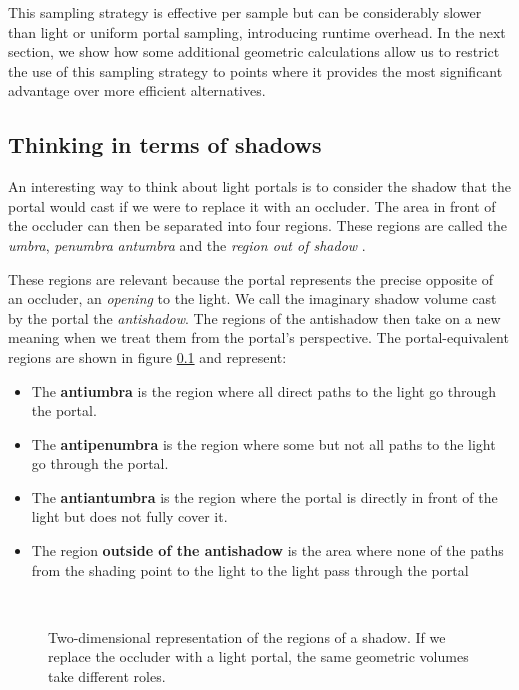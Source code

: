 This sampling strategy is effective per sample but can be considerably slower than light or uniform portal sampling, introducing runtime overhead. In the next section, we show how some additional geometric calculations allow us to restrict the use of this sampling strategy to points where it provides the most significant advantage over more efficient alternatives.

\subsection{Thinking in terms of shadows}
\label{sec:antishadow}

An interesting way to think about light portals is to consider the shadow that the portal would cast if we were to replace it with an occluder. The area in front of the occluder can then be separated into four regions. These regions are called the \emph{umbra}, \emph{penumbra} \emph{antumbra} and the \emph{region out of shadow} \cite{hasenfratzSurveyRealtimeSoft2003}. 

These regions are relevant because the portal represents the precise opposite of an occluder, an \emph{opening} to the light. We call the imaginary shadow volume cast by the portal the \emph{antishadow}. The regions of the antishadow then take on a new meaning when we treat them from the portal's perspective. The portal-equivalent regions are shown in figure \ref*{sec:antishadow} and represent:

\begin{itemize}
  \item The \textbf{antiumbra} is the region where all direct paths to the light go through the portal.
  \item The \textbf{antipenumbra} is the region where some but not all paths to the light go through the portal.
  \item The \textbf{antiantumbra} is the region where the portal is directly in front of the light but does not fully cover it.
  \item The region \textbf{outside of the antishadow} is the area where none of the paths from the shading point to the light to the light pass through the portal
\end{itemize}

\begin{figure}[H]
  \centering
  \\
  \label{fig:antishadow}
  \caption{Two-dimensional representation of the regions of a shadow. If we replace the occluder with a light portal, the same geometric volumes take different roles.}
\end{figure}

